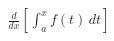 \documentclass[preview]{standalone}
\begin{document}
\begin{align*}
\frac{d}{dx} \left[ \int_{a}^{x} f(t) \, dt \right]
\end{align*}
\end{document}
